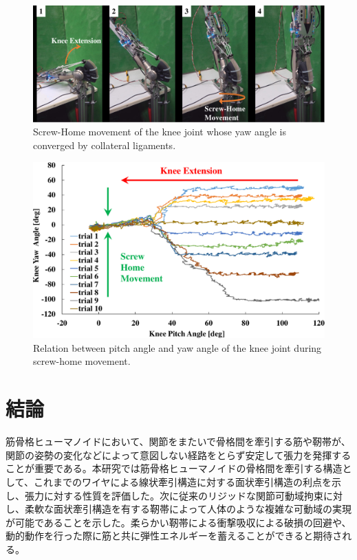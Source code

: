 \documentclass{jarticle}
\begin{document}
\begin{figure}[tb]
 \centering
  \includegraphics[width=1.0\textwidth]{figs/screw-home.pdf}
  \vspace*{-4mm}
  \caption{Screw-Home movement of the knee joint whose yaw angle is converged by collateral ligaments.}
  \label{fig:shm}
\end{figure}

\begin{figure}[tb]
 \centering
  \includegraphics[width=1.0\columnwidth]{figs/screw-home-convergence.pdf}
  \vspace*{-4mm}
  \caption{Relation between pitch angle and yaw angle of the knee joint during screw-home movement.}
  \label{fig:shm-graph}
\end{figure}

\section{結論}
筋骨格ヒューマノイドにおいて、関節をまたいで骨格間を牽引する筋や靭帯が、関節の姿勢の変化などによって意図しない経路をとらず安定して張力を発揮することが重要である。本研究では筋骨格ヒューマノイドの骨格間を牽引する構造として、これまでのワイヤによる線状牽引構造に対する面状牽引構造の利点を示し、張力に対する性質を評価した。次に従来のリジッドな関節可動域拘束に対し、柔軟な面状牽引構造を有する靭帯によって人体のような複雑な可動域の実現が可能であることを示した。柔らかい靭帯による衝撃吸収による破損の回避や、動的動作を行った際に筋と共に弾性エネルギーを蓄えることができると期待される。
\end{document}
